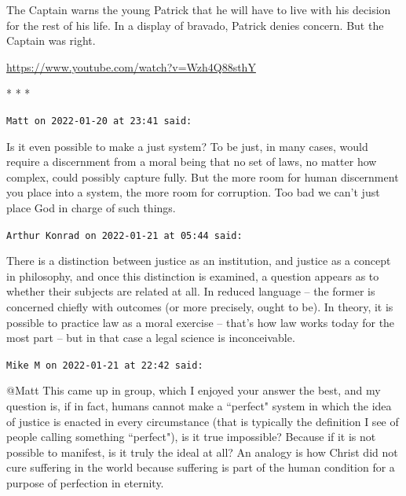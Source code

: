 The Captain warns the young Patrick that he will have to live with his decision for the rest of his life. In a display of bravado, Patrick denies concern. But the Captain was right.


\hfill

\url{https://www.youtube.com/watch?v=Wzh4Q88sthY}




\begin{center}* * *\end{center}

\begin{footnotesize}\begin{sffamily}



\texttt{Matt on 2022-01-20 at 23:41 said: }

Is it even possible to make a just system? To be just, in many cases, would require a discernment from a moral being that no set of laws, no matter how complex, could possibly capture fully. But the more room for human discernment you place into a system, the more room for corruption. Too bad we can't just place God in charge of such things.


\hfill

\texttt{Arthur Konrad on 2022-01-21 at 05:44 said: }

There is a distinction between justice as an institution, and justice as a concept in philosophy, and once this distinction is examined, a question appears as to whether their subjects are related at all. In reduced language – the former is concerned chiefly with outcomes (or more precisely, ought to be). In theory, it is possible to practice law as a moral exercise – that's how law works today for the most part – but in that case a legal science is inconceivable.


\hfill

\texttt{Mike M on 2022-01-21 at 22:42 said: }

@Matt This came up in group, which I enjoyed your answer the best, and my question is, if in fact, humans cannot make a ``perfect" system in which the idea of justice is enacted in every circumstance (that is typically the definition I see of people calling something ``perfect"), is it true impossible? Because if it is not possible to manifest, is it truly the ideal at all? An analogy is how Christ did not cure suffering in the world because suffering is part of the human condition for a purpose of perfection in eternity. 


\end{sffamily}
\end{footnotesize}
